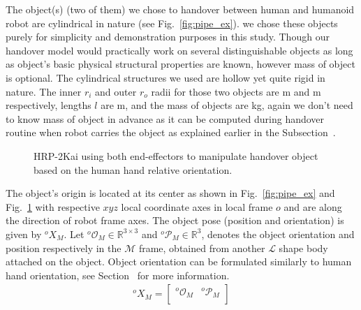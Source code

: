 The object(s) (two of them) we chose to handover between human and humanoid robot are cylindrical in nature (see Fig.~\ref{fig:pipe_ex}). we chose these objects purely for simplicity and demonstration purposes in this study. Though our handover model would practically work on several distinguishable objects as long as object's basic physical structural properties are known, however mass of object is optional. The cylindrical structures we used are hollow yet quite rigid in nature. The inner $r_i$ and outer $r_o$ radii for those two objects are  m and  m respectively, lengths $l$ are  m, and the mass of objects are  kg, again we don't need to know mass of object in advance as it can be computed during handover routine when robot carries the object as explained earlier in the Subsection~. 


\begin{figure}[hpt]
	\caption{HRP-2Kai using both end-effectors to manipulate handover object based on the human hand relative orientation.}
	\label{fig:pipe_ori}
\end{figure}


The object's origin is located at its center as shown in Fig.~\ref{fig:pipe_ex} and Fig.~\ref{fig:pipe_ori} with respective $xyz$ local coordinate axes in local frame $o$ and are along the direction of robot frame axes. The object pose (position and orientation) is given by ${}^{o}{X}_M$. Let ${{}^{o}\mathcal{O}_M} \in \mathbb{R}^{3\times3}$ and ${{}^{o}\mathcal{P}_M} \in \mathbb{R}^{3}$, denotes the object orientation and position respectively in the $\mathcal{M}$ frame, obtained from another $\mathcal{L}$ shape body attached on the object. Object orientation can be formulated similarly to human hand orientation, see Section~ for more information.
\begin{gather}\label{X_M_o}
{}^{o}{X}_M =
\left[\begin{array}{cc}
{}^{o}\mathcal{O}_M & {}^{o}\mathcal{P}_M \\
\end{array}\right]
\end{gather}


